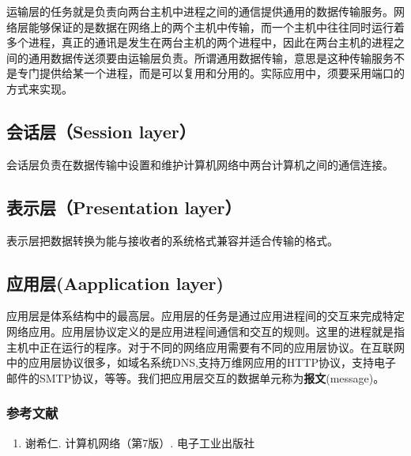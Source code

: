 运输层的任务就是负责向两台主机中进程之间的通信提供通用的数据传输服务。网络层能够保证的是数据在网络上的两个主机中传输，而一个主机中往往同时运行着多个进程，真正的通讯是发生在两台主机的两个进程中，因此在两台主机的进程之间的通用数据传送须要由运输层负责。所谓通用数据传输，意思是这种传输服务不是专门提供给某一个进程，而是可以复用和分用的。实际应用中，须要采用端口的方式来实现。

\subsection{会话层（Session layer）}

会话层负责在数据传输中设置和维护计算机网络中两台计算机之间的通信连接。

\subsection{表示层（Presentation layer）}

表示层把数据转换为能与接收者的系统格式兼容并适合传输的格式。


\subsection{应用层(Aapplication layer)}

应用层是体系结构中的最高层。应用层的任务是通过应用进程间的交互来完成特定网络应用。应用层协议定义的是应用进程间通信和交互的规则。这里的进程就是指主机中正在运行的程序。对于不同的网络应用需要有不同的应用层协议。在互联网中的应用层协议很多，如域名系统DNS,支持万维网应用的HTTP协议，支持电子邮件的SMTP协议，等等。我们把应用层交互的数据单元称为\textbf{报文}(message)。




\subsubsection{参考文献}
\begin{enumerate}
\item 谢希仁. 计算机网络（第7版）. 电子工业出版社
\end{enumerate}

